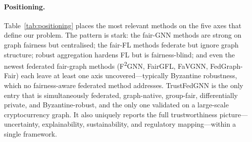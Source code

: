 \paragraph{Positioning.}
Table~\ref{tab:positioning} places the most relevant methods on the five axes
that define our problem. The pattern is stark: the fair-GNN methods are strong
on graph fairness but centralised; the fair-FL methods federate but ignore graph
structure; robust aggregation hardens FL but is fairness-blind; and even the
newest federated fair-graph methods (F\textsuperscript{2}GNN, FairGFL,
FaVGNN, FedGraph-Fair) each leave at least one axis uncovered---typically
Byzantine robustness, which no fairness-aware federated method addresses.
TrustFedGNN is the only entry that is simultaneously federated, graph-native,
group-fair, differentially private, and Byzantine-robust, and the only one
validated on a large-scale cryptocurrency graph. It also uniquely reports the
full trustworthiness picture---uncertainty, explainability, sustainability, and
regulatory mapping---within a single framework.


